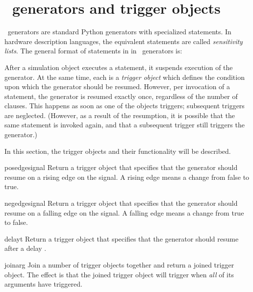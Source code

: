 \section{\myhdl\ generators and trigger objects}
\label{myhdl-generators}
\myhdl\ generators are standard Python generators with specialized
 statements. In hardware description languages, the equivalent
statements are called \emph{sensitivity lists}. The general format
of  statements in in \myhdl\ generators is:

\hspace{\leftmargin} 

After a simulation object executes a  statement, it
suspends execution of the generator. At the same time, each
 is a \emph{trigger object} which defines the condition
upon which the generator should be resumed. However, per invocation of a
 statement, the generator is resumed exactly once,
regardless of the number of clauses. This happens as soon as one
of the objects triggers; subsequent triggers are
neglected. (However, as a result of the resumption, it is possible
that the same  statement is invoked again, and that a
subsequent trigger still triggers the generator.)

In this section, the trigger objects and their functionality will be
described. 

\begin{funcdesc}{posedge}{signal}
Return a trigger object that specifies that the generator should
resume on a rising edge on the signal. A rising edge means a change
from false to true.
\end{funcdesc}

\begin{funcdesc}{negedge}{signal}
Return a trigger object that specifies that the generator should
resume on a falling edge on the signal. A falling edge means a change
from true to false.
\end{funcdesc}

\begin{funcdesc}{delay}{t}
Return a trigger object that specifies that the generator should
resume after a delay .
\end{funcdesc}

\begin{funcdesc}{join}{arg }
Join a number of trigger objects together and return a joined
trigger object.  The effect is that the joined trigger object will
trigger when \emph{all} of its arguments have triggered.
\end{funcdesc}

